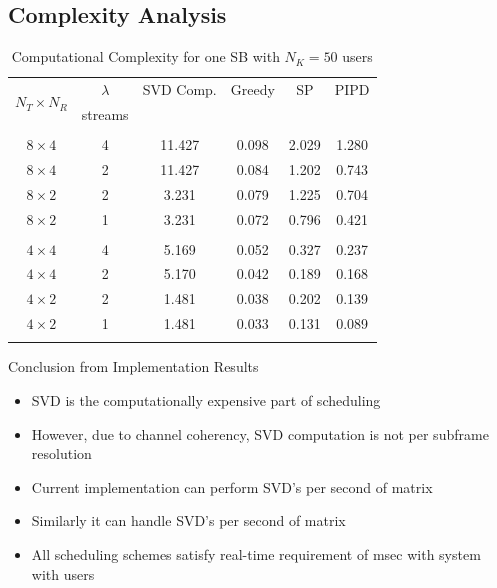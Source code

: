 \documentclass[11pt]{beamer}
\begin{document}
\subsection{Complexity Analysis}

\begin{frame}
\begin{table} \caption{Computational Complexity for one SB with $N_K = 50$ users} \begin{center} 
		\begin{tabular}{c c c c c c}
			\multirow{2}{*}{$N_T \times N_R $} & $\lambda$ & SVD Comp. & Greedy   & SP          & PIPD \\ 
			& streams & \eqn{\mathrm{msec}} & \eqn{\mathrm{msec}} & \eqn{\mathrm{msec}} & \eqn{\mathrm{msec}} \\
			\hline \\
			$8 \times 4$ & 4 & 11.427 & 0.098 & 2.029 & 1.280 \\ 
			$8 \times 4$ & 2 & 11.427 & 0.084 & 1.202 & 0.743 \\
			$8 \times 2$ & 2 & 3.231 & 0.079 & 1.225 & 0.704 \\
			$8 \times 2$ & 1 & 3.231 & 0.072 & 0.796 & 0.421 \\
			\hline \\
			$4 \times 4$ & 4 & 5.169 & 0.052 & 0.327 & 0.237 \\ 
			$4 \times 4$ & 2 & 5.170 & 0.042 & 0.189 & 0.168 \\
			$4 \times 2$ & 2 & 1.481 & 0.038 & 0.202 & 0.139 \\
			$4 \times 2$ & 1 & 1.481 & 0.033 & 0.131 & 0.089 \\
			\hline \vspace{-0.3in}
		\end{tabular} \label{table:compexity_comparison}\end{center}\end{table}
\end{frame}

\begin{frame}{Conclusion from Implementation Results}
	\begin{itemize}
		\item SVD is the computationally expensive part of scheduling
		\item However, due to channel coherency, SVD computation is not per subframe resolution
		\item Current implementation can perform  SVD's per second of  matrix
		\item Similarly it can handle  SVD's per second of  matrix
		\item All scheduling schemes satisfy real-time requirement of msec with  system with  users
	\end{itemize}
\end{frame}
\end{document}
